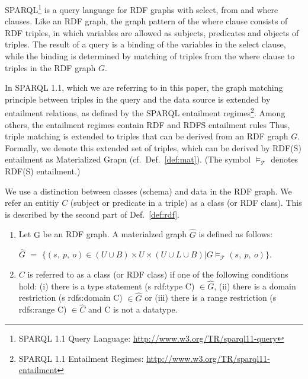 \documentclass{llncs} %
\begin{document}
SPARQL\footnote{SPARQL 1.1 Query Language: \url{http://www.w3.org/TR/sparql11-query}} 
is a query language for RDF graphs with  \textsf{select}, \textsf{from} and \textsf{where} clauses.
Like an RDF graph, the graph pattern of the \textsf{where} clause consists of RDF triples, in which
variables are allowed as subjects, predicates and objects of triples.
The result of a query is a binding of the variables in the \textsf{select} clause,
while the binding is determined by matching of triples from the \textsf{where} clause
to triples in the RDF graph $G$.

In SPARQL 1.1, which we are referring to in this paper, the graph matching principle between triples in the query and the data source
is extended by entailment relations, as defined by the SPARQL entailment regimes\footnote{SPARQL 1.1 Entailment Regimes:
\url{http://www.w3.org/TR/sparql11-entailment}}. Among others, the entailment regimes contain RDF and RDFS entailment rules
Thus, triple matching is extended to triples that can be derived from an RDF graph $G$. Formally, we denote
this extended set of triples, which can be derived by RDF(S) entailment as Materialized Grapn (cf.~Def.~\ref{def:mat}).
(The symbol $\models_{\mathcal{T}}$ denotes RDF(S) entailment.)

We use a distinction between classes (schema) and data in the RDF graph.
We refer an entitiy $C$ (subject or predicate in a triple) as a class (or RDF class).
This is described by the second part of Def.~\ref{def:rdf}.
 

\begin{definition}
\label{def:rdf}
\begin{enumerate}
	\item 
Let $\mathrm{G}$ be an RDF graph. A materialzed graph $\hat{G}$ is defined as follows:

$\hat{G}$ $=$ $\{ (s ,\ p , \ o) \in (U\cup B)\times U \times (U\cup L \cup B)  | G \models_{\mathcal{T}} (s, \ p, \ o) \}  $. 

\item
$C$ is referred to as a class (or RDF class) if one of the following conditions hold:
(i) there is a type statement  (s rdf:type C) $\in \hat{G}$,
 (ii) there is a domain restriction (s rdfs:domain C) $\in \hat{G}$ or 
(iii) there is a range restriction (s rdfs:range C) $\in \hat{C}$ and C is not a datatype.
\end{enumerate}
\end{definition}
\end{document}
